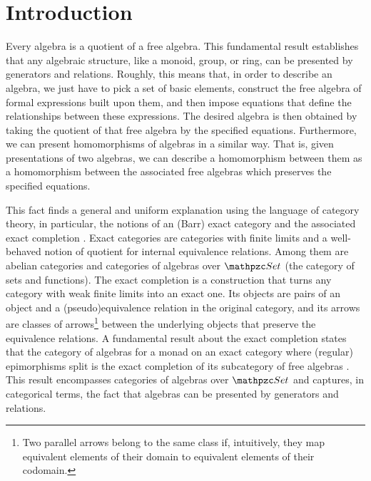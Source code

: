
\section{Introduction}
\label{sect:intro}

Every algebra is a quotient of a free algebra. This fundamental result establishes that any algebraic structure, like a monoid, group, or ring, can be presented by generators and relations.
% 
Roughly, this means that, in order to describe an algebra, we just have to pick a set of basic elements, construct the free algebra of formal expressions built upon them, and then impose equations that define the relationships between these expressions. The desired algebra is then obtained by taking the quotient of that free algebra by the specified equations.
% 
Furthermore, we can present homomorphisms of algebras in a similar way. 
That is, given presentations of two algebras, we can describe a homomorphism between them 
as a homomorphism between the associated free algebras which preserves the specified equations. 

This fact finds a general and uniform explanation using the language of category theory, in particular, the notions of an (Barr) exact category \cite{Barr71} and the associated exact completion \cite{CarboniA:freecl, CarboniA:regec}.
% 
Exact categories are categories with finite limits and a well-behaved notion of quotient for internal equivalence relations. Among them are abelian categories and categories of algebras over $\Set$ (the category of sets and functions).
% 
The exact completion is a construction that turns any category with weak finite limits into an exact one. Its objects are pairs of an object and a (pseudo)equivalence relation in the original category, and its arrows are classes of arrows\footnote{Two parallel arrows belong to the same class if, intuitively, they map equivalent elements of their domain to equivalent elements of their codomain.} between the underlying objects that preserve the equivalence relations.
% 
A fundamental result about the exact completion states that the category of algebras for a monad on an exact category where (regular) epimorphisms split  is the exact completion of its subcategory of free algebras \cite{Vitale94}. This result encompasses categories of algebras over $\Set$ and captures, in categorical terms, the fact that algebras can be presented by generators and relations.

